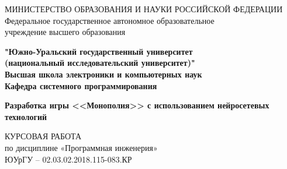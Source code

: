 \begin{article}

\thispagestyle{kmvmain}
\begin{center}

\large{
МИНИСТЕРСТВО ОБРАЗОВАНИЯ И НАУКИ РОССИЙСКОЙ ФЕДЕРАЦИИ}
\Large{Федеральное государственное автономное образовательное \\ 
учреждение высшего образования}

\Large{\textbf{
"Южно-Уральский государственный университет \\ 
(национальный исследовательский университет)" \\ 
Высшая школа электроники и компьютерных наук \\ 
Кафедра системного программирования}}\\

\vspace{1.5cm}

\Large{\textbf{
Разработка игры <<Монополия>> с использованием нейросетевых технологий}}

\vspace{1.5cm}

\Large{КУРСОВАЯ РАБОТА \\ 
по дисциплине «Программная инженерия» \\ 
ЮУрГУ – 02.03.02.2018.115-083.КР}

\vspace{1cm}
\end{center}


\end{article}
